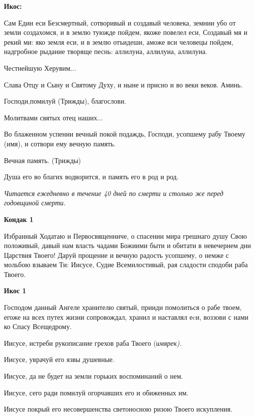 \bfseries Икос:\normalfont{}


Сам Един еси Безсмертный, сотворивый и создавый человека, земнии убо от земли создахомся, и в землю туюжде пойдем, якоже повелел еси, Создавый мя и рекий ми: яко земля еси, и в землю отъидеши, аможе вси человецы пойдем, надгробное рыдание творяще песнь: аллилуиа, аллилуиа, аллилуиа. 

Честнейшую Херувим... 

Слава Отцу и Сыну и Святому Духу, и ныне и присно и во веки веков. Аминь. 

Господи,помилуй (Трижды), благослови. 

Молитвами святых отец наших... 

Во блаженном успении вечный покой подаждь, Господи, усопшему рабу Твоему (имя), и сотвори ему вечную память. 

Вечная память. (Трижды) 

Душа его во благих водворится, и память его в род и род. 


\mychapterending

 


\itshape Читается ежедневно в течение 40 дней по смерти и столько же перед годовщиной смерти.\normalfont{} 

\bfseries Кондак 1 

\normalfont{}Избранный Ходатаю и Первосвященниче, о спасении мира грешнаго душу Свою положивый, давый нам власть чадами Божиими быти и обитати в невечернем дни Царствия Твоего! Даруй прощение и вечную радость усопшему, о немже с мольбою взываем Ти: Иисусе, Судие Всемилостивый, рая сладости сподоби раба Твоего.


\medskip


\bfseries Икос 1\normalfont{}


Господом данный Ангеле хранителю святый, прииди помолиться о рабе твоем, егоже на всех путех жизни сопровождал, хранил и наставлял еcи, воззови с нами ко Спасу Всещедрому. 

Иисусе, истреби рукописание грехов раба Твоего (\itshape имярек\normalfont{}). 

Иисусе, уврачуй его язвы душевные. 

Иисусе, да не будет на земли горьких воспоминаний о нем. 

Иисусе, сего ради помилуй огорчавших его и обиженных им. 

Иисусе покрый его несовершенства светоносною ризою Твоего искупления. 

